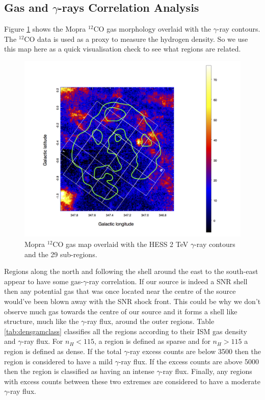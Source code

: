 \documentclass[12pt,a4paper]{article}
\begin{document}
\subsection{Gas and \textbf{$\gamma$}-rays Correlation Analysis}
Figure \ref{fig:sgpsnantenregmaphesscont} shows the Mopra $^{12}$CO gas morphology overlaid with the $\gamma$-ray contours. 
The $^{12}$CO data is used as a proxy to measure the hydrogen density. 
So we use this map here as a quick visualisation check to see what regions are related.
\begin{figure}[h]
	\centering
	\includegraphics[width=0.75\linewidth, height=0.35\textheight]{mopra_regmap_hesscont}
	\caption{Mopra $^{12}$CO gas map overlaid with the HESS 2 TeV $\gamma$-ray contours and the 29 sub-regions.}
	\label{fig:sgpsnantenregmaphesscont}
\end{figure}
Regions along the north and following the shell around the east to the south-east appear to have some gas-$\gamma$-ray correlation. If our source is indeed a SNR shell then any potential gas that was once located near the centre of the source would've been blown away with the SNR shock front. This could be why we don't observe much gas towards the centre of our source and it forms a shell like structure, much like the $\gamma$-ray flux, around the outer regions. Table \ref{tab:densgamclass} classifies all the regions according to their ISM gas density and $\gamma$-ray flux. For $n_H < 115$, a region is defined as sparse and for $n_H > 115$ a region is defined as dense. If the total $\gamma$-ray excess counts are below 3500 then the region is considered to have a mild $\gamma$-ray flux. If the excess counts are above 5000 then the region is classified as having an intense $\gamma$-ray flux. Finally, any regions with excess counts between these two extremes are considered to have a moderate $\gamma$-ray flux. 
\end{document}
